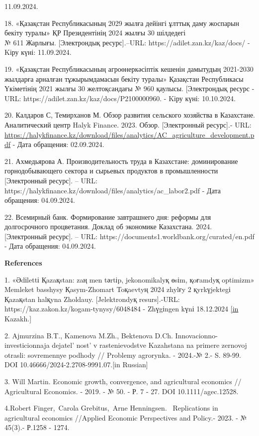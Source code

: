 {{11.09.2024.

18. «Қазақстан Республикасының 2029 жылға дейінгі ұлттық даму жоспарын
бекіту туралы» ҚР Президентінің 2024 жылғы 30 шілдедегі\\
№ 611 Жарлығы. {[}Электрондық ресурс{]}.--URL:
https://adilet.zan.kz/kaz/docs/ - Kіру күні: 11.09.2024.

19. «Қазақстан Республикасының агроөнеркәсіптік кешенін дамытудың
2021-2030 жылдарға арналған тұжырымдамасын бекіту туралы» Қазақстан
Республикасы Үкіметінің 2021 жылғы 30 желтоқсандағы № 960 қаулысы.
{[}Электрондық ресурс - URL: https://adilet.zan.kz/kaz/docs/P2100000960.
- Kіру күні: 10.10.2024.

20. Калдаров С, Темирханов М. Обзор развития сельского хозяйства в
Казахстане. Аналитический центр Halyk Finance. 2023. Обзор.
{[}Электронный ресурс{]}.- URL:
\url{https://halykfinance.kz/download/files/analytics/AC_agriculture_development.pdf}
- Дата обращения: 02.09.2024.

21. Ахмедьярова А. Производительность труда в Казахстане: доминирование
горнодобывающего сектора и сырьевых продуктов в промышленности
{[}Электронный ресурс{]}. -- URL:
https://halykfinance.kz/download/files/analytics/ac\_labor2.pdf - Дата
обращения: 04.09.2024.

22. Всемирный банк. Формирование завтрашнего дня: реформы для
долгосрочного процветания. Доклад об экономике Казахстана. 2024.
{[}Электронный ресурс{]}. -- URL:
https://documents1.worldbank.org/curated/en.pdf - Дата обращения:
04.09.2024.

{\bfseries References}

1. «Әdіlettі Қazaқstan: zaң men tәrtіp, jekonomikalyқ өsіm, қoғamdyқ
optimizm» Memleket basshysy Қasym-Zhomart Toқaevtyң 2024 zhylғy 2
қyrkүjektegі Қazaқstan halқyna Zholdauy. {[}Jelektrondyқ resurs{]}.-URL:
https://kaz.zakon.kz/kogam-tynysy/6048484 - Zhүgіngen kүnі 18.12.2024
\href{https://kaz.zakon.kz/kogam-tynysy/6048484.\%20\%20\%20\%5bin}{{[}in}
Kazakh.{]}

2. Ajmurzina B.T., Kamenova M.Zh., Bektenova D.Ch.
Innovacionno-investicionnaja
dejatel' nost'{} v rastenievodstve
Kazahstana na primere zernovoj otrasli: sovremennye podhody // Problemy
agrorynka. - 2024.-№ 2.- S. 89-99. DOI
10.46666/2024-2.2708-9991.07.{[}in Russian{]}

3. Will Martin. Economic growth, convergence, and agricultural economics
// Agricultural Economics. - 2019. - № 50. - Р. 7 - 27. DOI
10.1111/agec.12528.

4.Robert Finger,~Carola Grebitus,~Arne Henningsen. ~Replications in
agricultural economics //Applied Economic Perspectives and Policy.-
2023. - № 45(3).- Р.1258 - 1274.

}}
